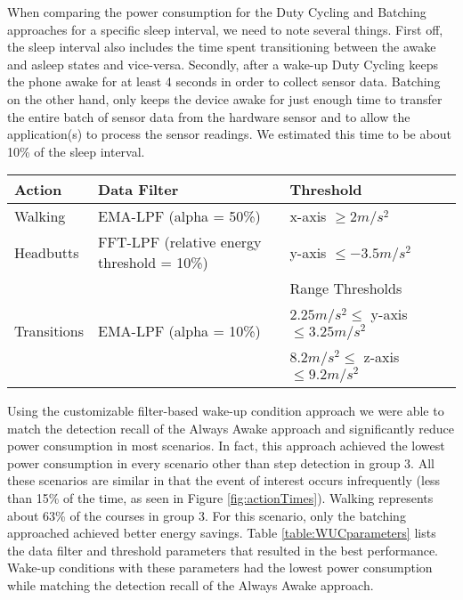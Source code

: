 When comparing the power consumption for the Duty Cycling and Batching approaches for a specific sleep interval, we need to note several things. First off, the sleep interval also includes the time spent transitioning between the awake and asleep states and vice-versa. Secondly, after a wake-up Duty Cycling keeps the phone awake for at least 4 seconds in order to collect sensor data. Batching on the other hand, only keeps the device awake for just enough time to transfer the entire batch of sensor data from the hardware sensor and to allow the application(s) to process the sensor readings. We estimated this time to be about 10\% of the sleep interval. 


\begin{table*}[t]
    \begin{tabular}{|l|l|l|l|}
	\hline
    Action      					& Data Filter & Threshold \\ \hline
    Walking     					& EMA-LPF (alpha = 50\%) 						& x-axis $\geq 2 m/s^2$ 		\\ \hline
	Headbutts   					& FFT-LPF (relative energy threshold = 10\%) 	& y-axis $\leq -3.5 m/s^2$ 		\\ \hline
	\multirow{3}{*}{Transitions} 	& \multirow{3}{*}{EMA-LPF (alpha = 10\%)}		& Range Thresholds						\\ 
									&												& $2.25 m/s^2 \leq$ y-axis $\leq 3.25 m/s^2$ 	\\ 
									&												& $8.2 m/s^2 \leq$ z-axis $\leq 9.2 m/s^2$ 	\\ \hline
    \end{tabular}
	\caption{Filter-based Wake-up Conditions parameters that achieved the lowest power consumption while matching detection recall of the Always Awake approach}
	\label{table:WUCparameters}
\end{table*}

Using the customizable filter-based wake-up condition approach we were able to match the detection recall of the Always Awake approach and significantly reduce power consumption in most scenarios. In fact, this approach achieved the lowest power consumption in every scenario other than step detection in group 3. All these scenarios are similar in that the event of interest occurs infrequently (less than 15\% of the time, as seen in Figure \ref{fig:actionTimes}). Walking represents about 63\% of the courses in group 3. For this scenario, only the batching approached achieved better energy savings. Table \ref{table:WUCparameters} lists the data filter and threshold parameters that resulted in the best performance. Wake-up conditions with these parameters had the lowest power consumption while matching the detection recall of the Always Awake approach.

